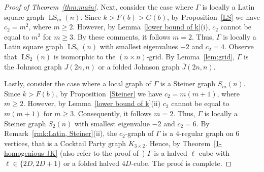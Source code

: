 \documentclass[11pt]{article}
\theoremstyle{definition}
\numberwithin{equation}{section}
\numberwithin{equation}{section}
\begin{document}
\begin{proof}[Proof of Theorem~\ref{thm:main}]
Next, consider the case where $\Gamma$ is locally a Latin square graph $\operatorname{LS}_m(n)$.
Since $k > F(b) > G(b)$, by Proposition~\ref{LS} we have $c_2=m^2$, where $m\geqslant 2$.
However, by Lemma~\ref{lower bound of k}(i), $c_2$ cannot be equal to $m^2$ for $m\geqslant 3$.
By these comments, it follows $m=2$.
Thus, $\Gamma$ is locally a Latin square graph $\operatorname{LS}_2(n)$ with smallest eigenvalues $-2$ and $c_2=4$.
Observe that $\operatorname{LS}_2(n)$ is isomorphic to the $(n \times n)$-grid.
By Lemma~\ref{lem:grid}, $\Gamma$ is the Johnson graph $J(2n,n)$ or a folded Johnson graph $\bar{J}(2n,n)$.

Lastly, consider the case where a local graph of $\Gamma$ is a Steiner graph $S_m(n)$.
Since $k > F(b)$, by Proposition~\ref{Steiner} we have $c_2=m(m+1)$, where $m\geqslant 2$.
However, by Lemma~\ref{lower bound of k}(ii) $c_2$ cannot be equal to $m(m+1)$ for $m\geqslant 3$.
Consequently, it follows $m=2$.
Thus, $\Gamma$ is locally a Steiner graph $S_2(n)$ with smallest eigenvalue $-2$ and $c_2 = 6$.
By Remark~\ref{rmk:Latin, Steiner}(ii), the $c_2$-graph of $\Gamma$ is a $4$-regular graph on $6$ vertices, that is a Cocktail Party graph $K_{3\times2}$. 
Hence, by Theorem~\ref{1-homogenious JK} (also refer to the proof of~\cite[Theorem 5.3]{JK2003}) $\Gamma$ is a halved $\ell$-cube with $\ell \in \{2D,2D+1\}$ or a folded halved $4D$-cube.
The proof is complete.
\end{proof}
\end{document}

